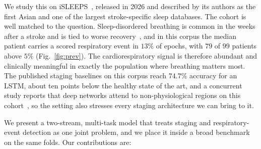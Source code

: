 \documentclass{ieeeaccess}
\begin{document}
We study this on iSLEEPS~\cite{maiti2026isleeps}, released in 2026 and described by its
authors as the first Asian and one of the largest stroke-specific sleep databases. The cohort is well matched to the question.
Sleep-disordered breathing is common in the weeks after a stroke and is tied to worse
recovery~\cite{bassetti2006sleep,denis2024sleep}, and in this corpus the median patient
carries a scored respiratory event in $13\%$ of epochs, with $79$ of $99$ patients above
$5\%$ (Fig.~\ref{fig:prev}). The cardiorespiratory signal is therefore abundant and
clinically meaningful in exactly the population where breathing matters most. The published
staging baselines on this corpus reach $74.7\%$ accuracy for an LSTM, about ten points below
the healthy state of the art, and a concurrent study reports that deep networks attend to
non-physiological regions on this cohort~\cite{bose2026gap}, so the setting also stresses
every staging architecture we can bring to it.

We present a two-stream, multi-task model that treats staging and respiratory-event
detection as one joint problem, and we place it inside a broad benchmark on the same folds. Our
contributions are:
\end{document}
